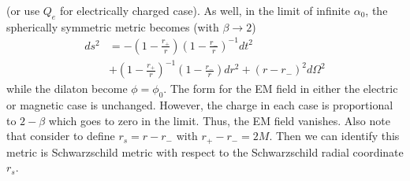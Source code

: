 \documentclass[%
 reprint,
 amsmath,amssymb,
 aps,
]{revtex4-1}
\begin{document}
(or use $Q_e$ for electrically charged case). As well, in the limit of infinite $\alpha_0$, the spherically symmetric metric becomes (with $\beta \rightarrow 2$)
\begin{align}
ds^2 &= - \left( 1 - \frac{r_+}{r} \right) \left(1 - \frac{r_-}{r} \right)^{-1} dt^2 \nonumber \\
&+ \left( 1 - \frac{r_+}{r} \right)^{-1} \left(1 - \frac{r_-}{r} \right) dr^2 + (r-r_-)^2 d\Omega^2
\end{align}
while the dilaton become $\phi = \phi_0$. The form for the EM field in either the electric or magnetic case is unchanged. However, the charge in each case is proportional to $2-\beta$ which goes to zero in the limit. Thus, the EM field vanishes. Also note that consider to define $r_s = r - r_-$ with $r_+ - r_- = 2M$. Then we can identify this metric is Schwarzschild metric with respect to the Schwarzschild radial coordinate $r_s$.


\end{document}
